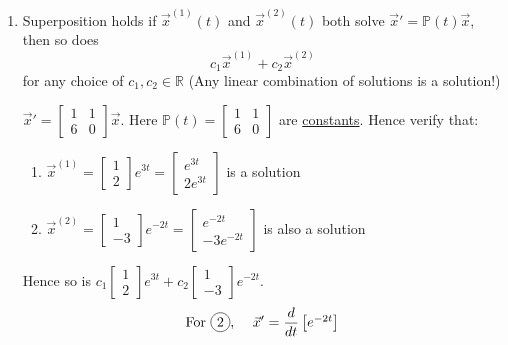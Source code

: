 \begin{enumerate}[label=\protect\circled{\arabic*}]
	\item Superposition holds if $\vec{x}^{(1)}(t)$ and $\vec{x}^{(2)}(t)$ both solve $\vec{x}' = \mathbb{P}(t)\vec{x}$, then so does
	\begin{equation*}
		c_1 \vec{x}^{(1)} + c_2 \vec{x}^{(2)}
	\end{equation*}
	for any choice of $c_1, c_2 \in \mathbb{R}$ (Any linear combination of solutions is a solution!)
	\begin{example-N}
		$\vec{x}' = \begin{bmatrix}
			1 & 1\\ 6 & 0
		\end{bmatrix} \vec{x}$. Here $\mathbb{P}(t) = \begin{bmatrix}
			1 & 1\\ 6 & 0
		\end{bmatrix}$ are \underline{constants}. Hence verify that:
		\begin{enumerate}[label=\protect\circled{\arabic*}]
			\item $\vec{x}^{(1)} = \begin{bmatrix}
				1\\ 2
			\end{bmatrix} e^{3t} = \begin{bmatrix}
				e^{3t}\\ 2e^{3t}
			\end{bmatrix}$ is a solution
			\item $\vec{x}^{(2)} = \begin{bmatrix}
				1\\ -3
			\end{bmatrix} e^{-2t} = \begin{bmatrix}
				e^{-2t}\\ -3e^{-2t}
			\end{bmatrix}$ is also a solution
		\end{enumerate}
		Hence so is $c_1 \begin{bmatrix}
				1\\ 2
			\end{bmatrix} e^{3t} + c_2 \begin{bmatrix}
				1\\ -3
			\end{bmatrix} e^{-2t}$.
		\begin{equation*}
			\text{For \circled{2}, } \quad \vec{x}' = \dfrac{d}{dt}
			\begin{bmatrix}
				e^{-2t}\\

\end{bmatrix}
\end{equation*}
\end{example-N}
\end{enumerate}
